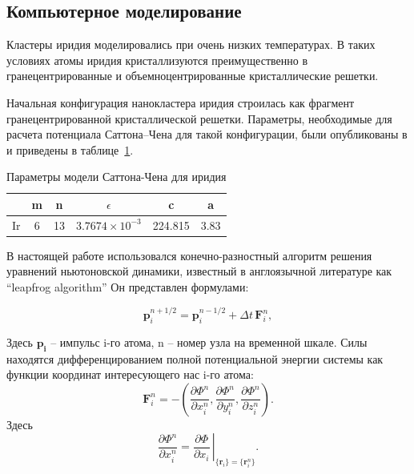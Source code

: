\subsection{Компьютерное моделирование}
\label{sec:2b}

Кластеры иридия моделировались при очень низких температурах. %
В таких условиях атомы иридия кристаллизуются преимущественно в гранецентрированные
и объемноцентрированные кристаллические решетки.

Начальная конфигурация нанокластера иридия строилась как фрагмент гранецентрированной
кристаллической решетки. Параметры, необходимые для расчета потенциала Саттона--Чена
для такой конфигурации, были опубликованы в \cite{kimura1998}
и приведены в таблице~\ref{table:iridium}.

\begin{table}[h!]
\begin{center}
\begin{tabular}{|c|c|c|c|c|c|}
\hline
 & m & n & $\epsilon$ & c & a \\
\hline
Ir & 6 & 13 & $3.7674\times10^{-3}$ & 224.815 & 3.83\\
\hline
\end{tabular}
\caption{Параметры модели Саттона-Чена для иридия}
\label{table:iridium}
\end{center}
\end{table}

В настоящей работе использовался конечно-разностный алгоритм решения уравнений ньютоновской динамики,
известный в англоязычной литературе как ``leapfrog algorithm''%
Он представлен формулами:

\begin{equation}
\label{LF1}
\mathbf{p}^{n+1/2}_i = \mathbf{p}^{n-1/2}_i + \Delta t \, \mathbf{F}^{n}_i,
\end{equation}

Здесь $\mathbf{p_i}$ -- импульс i-го атома, n -- номер узла на временной шкале. Силы находятся дифференцированием полной потенциальной энергии системы как функции координат интересующего нас i-го атома:
\begin{equation}
\label{LF:Force}
\mathbf{F}^{n}_i = - \left(\dfrac{\partial {\Phi}^n}{\partial x^{n}_i}, \dfrac{\partial {\Phi}^n}{\partial y^{n}_i}, \dfrac{\partial {\Phi}^n}{\partial z^{n}_i} \right).
\end{equation}
Здесь
\begin{equation}
\dfrac{\partial {\Phi}^n}{\partial x^{n}_i} = \left. \dfrac{\partial \Phi}{\partial x_i} \, \right|_{\{\mathbf{r}_i\} = \{\mathbf{r}^{n}_i\}}.
\end{equation}

